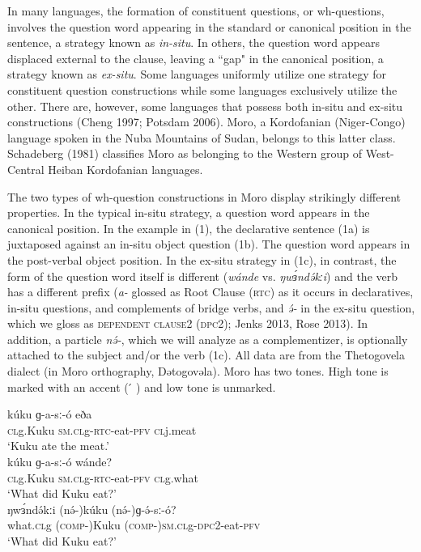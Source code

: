In many languages, the formation of constituent questions, or wh-questions, involves the question word appearing in the standard or canonical position in the sentence, a strategy known as \textit{in-situ}. In others, the question word appears displaced external to the clause, leaving a ``gap" in the canonical position, a strategy known as \textit{ex-situ}.  Some languages uniformly utilize one strategy for constituent question constructions while some languages exclusively utilize the other. There are, however, some languages that possess both in-situ and ex-situ constructions (Cheng 1997; Potsdam 2006). Moro, a Kordofanian (Niger-Congo) language spoken in the Nuba Mountains of Sudan, belongs to this latter class.  Schadeberg (1981) classifies Moro as belonging to the Western group of West-Central Heiban Kordofanian languages. 

The two types of wh-question constructions in Moro display strikingly different properties. In the typical in-situ strategy, a question word appears in the canonical position. In the example in (1), the declarative sentence (1a) is juxtaposed against an in-situ object question (1b). The question word appears in the post-verbal object position. In the ex-situ strategy in (1c), in contrast, the form of the question word itself is different (\textit{wánde} vs. \textit{ŋwɜ́ndə́kːi}) and the verb has a different prefix (\textit{a-} glossed as Root Clause (\textsc{rtc}) as it occurs in declaratives, in-situ questions, and complements of bridge verbs, and \textit{ə́-} in the ex-situ question, which we gloss as \textsc{dependent clause}2 (\textsc{dpc}2); Jenks 2013, Rose 2013). In addition, a particle \textit{nə́-}, which we will analyze as a complementizer, is optionally attached to the subject and/or the verb (1c). All data are from the Thetogovela dialect (in Moro orthography, Dətogovəla).  Moro has two tones. High tone is marked with an accent (\hspace{2pt}  ́ ) and low tone is unmarked.

\ea
\ea  \gll kúku         ɡ-a-sː-ó               	eða\\
	\textsc{cl}g.Kuku   \textsc{sm.cl}g-\textsc{rtc}-eat-\textsc{pfv}	\textsc{cl}j.meat     	\\		     	     \trans ‘Kuku ate the meat.’\\
\ex  \gll kúku	ɡ-a-sː-ó	wánde?\\
	\textsc{cl}g.Kuku	\textsc{sm.cl}g-\textsc{rtc}-eat-\textsc{pfv}   	\textsc{cl}g.what\\
	\trans ‘What did Kuku eat?’\\
\ex	\gll ŋwɜ́ndə́kːi	(nə́-)kúku     	(nə́-)ɡ-ə́-sː-ó?                \\
	what.\textsc{cl}g	(\textsc{comp-})Kuku  	(\textsc{comp-})\textsc{sm.cl}g-\textsc{dpc}2-eat-\textsc{pfv}  \\
	\trans ‘What did Kuku eat?’\\
\z
\z

